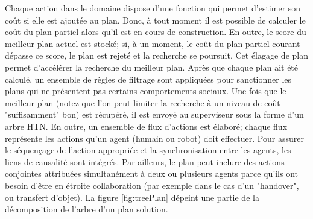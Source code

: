 \documentclass[a4paper,11pt,twoside]{StyleThese}
\begin{document}




Chaque action dans le domaine dispose d'une fonction qui permet d'estimer son coût si elle est ajoutée au plan. Donc, à tout moment il est possible de calculer le coût du plan partiel alors qu'il est en cours de construction. En outre, le score du meilleur plan actuel est stocké; si, à un moment, le coût du plan partiel courant dépasse ce score, le plan est rejeté et la recherche se poursuit. Cet élagage de plan permet d'accélérer la recherche du meilleur plan. Après que chaque plan ait été calculé, un ensemble de règles de filtrage sont appliquées pour sanctionner les plans qui ne présentent pas certains comportements sociaux. Une fois que le meilleur plan (notez que l'on peut limiter la recherche à un niveau de coût "suffisamment" bon) est récupéré, il est envoyé au superviseur sous la forme d'un arbre HTN. En outre, un ensemble de flux d'actions est élaboré; chaque flux représente les actions qu'un agent (humain ou robot) doit effectuer. Pour assurer le séquençage de l'action appropriée et la synchronisation entre les agents, les liens de causalité sont intégrés. Par ailleurs, le plan peut inclure des actions conjointes attribuées simultanément à deux ou plusieurs agents parce qu'ils ont besoin d'être en étroite collaboration (par exemple dans le cas d'un "handover", ou transfert d'objet). La figure \ref{fig:treePlan}
dépeint une partie de la décomposition de l'arbre d'un plan solution.
\end{document}
